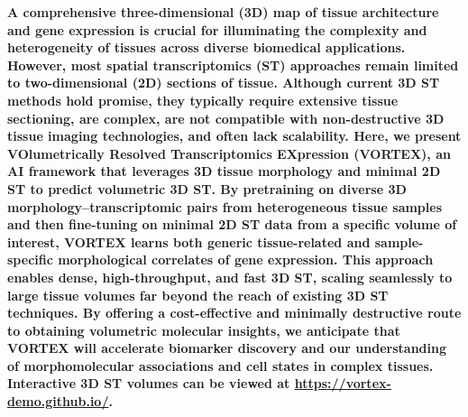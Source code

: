 \begin{spacing}{1.2}
\noindent\textbf{
\noindent A comprehensive three-dimensional (3D) map of tissue architecture and gene expression is crucial for illuminating the complexity and heterogeneity of tissues across diverse biomedical applications\cite{erturk2024deep}. However, most spatial transcriptomics (ST) approaches remain limited to two-dimensional (2D) sections of tissue\cite{staahl2016visualization, marx2021method, moses2022museum}. Although current 3D ST methods hold promise, they typically require extensive tissue sectioning, are complex, are not compatible with non-destructive 3D tissue imaging technologies, and often lack scalability\cite{wang2023construction, tang2024search, schott2024open, mo2024tumour}. Here, we present VOlumetrically Resolved Transcriptomics EXpression (VORTEX), an AI framework that leverages 3D tissue morphology and minimal 2D ST to predict volumetric 3D ST. By pretraining on diverse 3D morphology–transcriptomic pairs from heterogeneous tissue samples and then fine-tuning on minimal 2D ST data from a specific volume of interest, VORTEX learns both generic tissue-related and sample-specific morphological correlates of gene expression. This approach enables dense, high-throughput, and fast 3D ST, scaling seamlessly to large tissue volumes far beyond the reach of existing 3D ST techniques. By offering a cost-effective and minimally destructive route to obtaining volumetric molecular insights, we anticipate that VORTEX will accelerate biomarker discovery and our understanding of morphomolecular associations and cell states in complex tissues.  Interactive 3D ST volumes can be viewed at \url{https://vortex-demo.github.io/}. 
}
\end{spacing}

